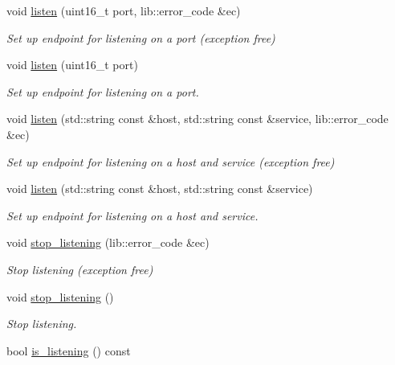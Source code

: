\begin{DoxyCompactItemize}
void \mbox{\hyperlink{classwebsocketpp_1_1transport_1_1asio_1_1endpoint_ae7da6e2c944c3e1a087495b9d998dc8b}{listen}} (uint16\+\_\+t port, lib\+::error\+\_\+code \&ec)
\begin{DoxyCompactList}\small\item\em Set up endpoint for listening on a port (exception free) \end{DoxyCompactList}\item 
void \mbox{\hyperlink{classwebsocketpp_1_1transport_1_1asio_1_1endpoint_a80c1e2bb6edbfbfc46d387015e528117}{listen}} (uint16\+\_\+t port)
\begin{DoxyCompactList}\small\item\em Set up endpoint for listening on a port. \end{DoxyCompactList}\item 
void \mbox{\hyperlink{classwebsocketpp_1_1transport_1_1asio_1_1endpoint_a85606665cc9c948194076c2377cb61c0}{listen}} (std\+::string const \&host, std\+::string const \&service, lib\+::error\+\_\+code \&ec)
\begin{DoxyCompactList}\small\item\em Set up endpoint for listening on a host and service (exception free) \end{DoxyCompactList}\item 
void \mbox{\hyperlink{classwebsocketpp_1_1transport_1_1asio_1_1endpoint_ad69ca2f648f48c7616ad1df614d88d67}{listen}} (std\+::string const \&host, std\+::string const \&service)
\begin{DoxyCompactList}\small\item\em Set up endpoint for listening on a host and service. \end{DoxyCompactList}\item 
void \mbox{\hyperlink{classwebsocketpp_1_1transport_1_1asio_1_1endpoint_a0da87d3a3e8ee8279fe59eb0385d81e3}{stop\+\_\+listening}} (lib\+::error\+\_\+code \&ec)
\begin{DoxyCompactList}\small\item\em Stop listening (exception free) \end{DoxyCompactList}\item 
void \mbox{\hyperlink{classwebsocketpp_1_1transport_1_1asio_1_1endpoint_af4ae00e12a34475a1950d69f5b9da507}{stop\+\_\+listening}} ()
\begin{DoxyCompactList}\small\item\em Stop listening. \end{DoxyCompactList}\item 
bool \mbox{\hyperlink{classwebsocketpp_1_1transport_1_1asio_1_1endpoint_af33506cbd90a184cdf1a0424ec2d0619}{is\+\_\+listening}} () const

\end{DoxyCompactItemize}
